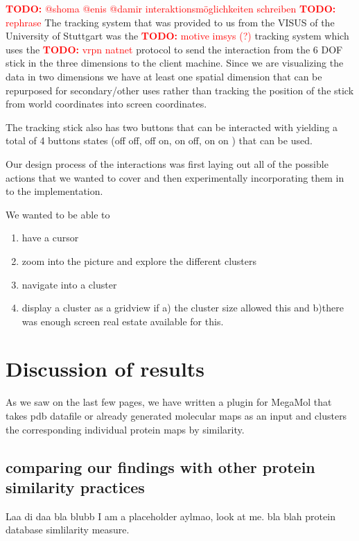 \documentclass[journal]{vgtc}       %
\newcommand{\todo}[1]{\textcolor{red}{\textbf{TODO:} #1}}
\begin{document}
\todo{@shoma @enis @damir interaktionsmöglichkeiten schreiben}
\todo{rephrase}
The tracking system that was provided to us from the VISUS of the University of Stuttgart was the \todo{motive imsys (?)} tracking system which uses the \todo{vrpn natnet} protocol to send the interaction from the 6 DOF stick in the three dimensions to the client machine. 
Since we are visualizing the data in two dimensions we have at least one spatial dimension that can be repurposed for secondary/other uses rather than tracking the position of the stick from world coordinates into screen coordinates.

The tracking stick also has two buttons that can be interacted with yielding a total of 4 buttons states (off off, off on, on off, on on ) that can be used.

Our design process of the interactions was first  laying out all of the possible actions that we wanted to cover and then experimentally incorporating them in to the implementation.

We wanted to be able to 
\begin{enumerate}
  \item have a cursor 
  \item zoom into the picture and  explore the different clusters
  \item navigate into a cluster
  \item display a cluster as a gridview if a) the cluster size allowed this and b)there was enough screen real estate available for this.
  
\end{enumerate}



\section{Discussion of results}
As we saw on the last few pages, we have written a plugin for MegaMol that takes pdb datafile or already generated molecular maps as an input and clusters  the corresponding individual protein maps by similarity.

\subsection{comparing our findings with other protein similarity practices} 
Laa di daa bla blubb I am a placeholder aylmao, look at me. bla \cite{3dsurfer} blah protein database simlilarity measure.
\end{document}
